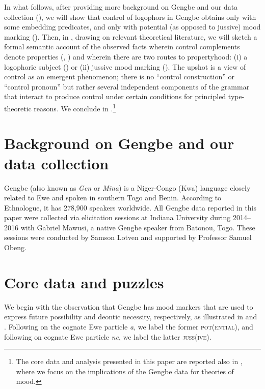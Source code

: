 \documentclass[output=paper,modfonts,nonflat]{langsci/langscibook}
\begin{document}
In what follows, after providing more background on Gengbe and our data collection (), we will show that control of  logophors in Gengbe obtains only with some embedding predicates, and only with potential (as opposed to jussive) mood marking (). Then, in , drawing on  relevant theoretical literature, we will sketch a formal semantic account of the observed facts wherein control complements denote properties (\citealt{Chierchi1984}, \citealt{Dowty1985}) and wherein there are two routes to propertyhood: (i) a logophoric subject (\citealt{Pearson2015}) or (ii) jussive mood marking (\citealt{Zanuttini2012}). The upshot is a view of control as an emergent phenomenon; there is no ``control construction'' or ``control pronoun'' but rather several independent components of the grammar that interact to produce control under certain conditions for principled type-theoretic reasons. We conclude in .\footnote{The core data and analysis presented in this paper are reported also in \cite{GranoToappear}, where we focus on the implications of the Gengbe data for theories of mood.}

 

\section{Background on Gengbe and our data collection}
\label{sec:Grano:GengbeBackground:2}

Gengbe (also known as \emph{Gen} or \emph{Mina}) is a Niger-Congo (Kwa) language closely related to Ewe and spoken in southern Togo and Benin. According to Ethnologue, it has 278,900 speakers worldwide.  All Gengbe data reported in this paper were collected via elicitation sessions at Indiana University during 2014--2016 with Gabriel Mawusi, a native Gengbe speaker from Batonou, Togo. These sessions were conducted by Samson Lotven and supported by Professor Samuel Obeng.



\section{Core data and puzzles}
\label{sec:Grano:CoreData:3}

We begin with the observation that Gengbe has mood markers that are used to express future possibility and deontic necessity, respectively, as illustrated in  and . Following \cite{Essegbey2008} on the  cognate  Ewe particle \emph{a}, we label the former \textsc{pot}(\textsc{ential}), and following \cite{Amek2008} on  cognate Ewe particle \emph{ne}, we label the latter \textsc{juss}(\textsc{ive}).
\end{document}
